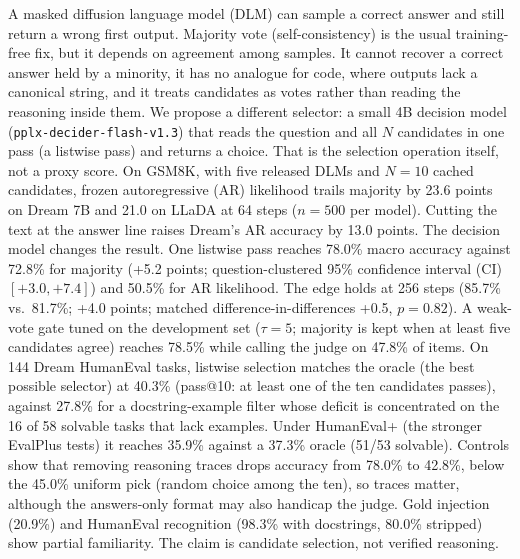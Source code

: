 A masked diffusion language model (DLM) can sample a correct answer and still return a wrong first output. Majority vote (self-consistency) is the usual training-free fix, but it depends on agreement among samples. It cannot recover a correct answer held by a minority, it has no analogue for code, where outputs lack a canonical string, and it treats candidates as votes rather than reading the reasoning inside them. We propose a different selector: a small 4B decision model (\texttt{pplx-decider-flash-v1.3}) that reads the question and all $N$ candidates in one pass (a listwise pass) and returns a choice. That is the selection operation itself, not a proxy score. On GSM8K, with five released DLMs and $N=10$ cached candidates, frozen autoregressive (AR) likelihood trails majority by 23.6 points on Dream 7B and 21.0 on LLaDA at 64 steps ($n=500$ per model). Cutting the text at the answer line raises Dream's AR accuracy by 13.0 points. The decision model changes the result. One listwise pass reaches 78.0\% macro accuracy against 72.8\% for majority (+5.2 points; question-clustered 95\% confidence interval (CI) $[+3.0,+7.4]$) and 50.5\% for AR likelihood. The edge holds at 256 steps (85.7\% vs.\ 81.7\%; +4.0 points; matched difference-in-differences +0.5, $p=0.82$). A weak-vote gate tuned on the development set ($\tau=5$; majority is kept when at least five candidates agree) reaches 78.5\% while calling the judge on 47.8\% of items. On 144 Dream HumanEval tasks, listwise selection matches the oracle (the best possible selector) at 40.3\% (pass@10: at least one of the ten candidates passes), against 27.8\% for a docstring-example filter whose deficit is concentrated on the 16 of 58 solvable tasks that lack examples. Under HumanEval+ (the stronger EvalPlus tests) it reaches 35.9\% against a 37.3\% oracle (51/53 solvable). Controls show that removing reasoning traces drops accuracy from 78.0\% to 42.8\%, below the 45.0\% uniform pick (random choice among the ten), so traces matter, although the answers-only format may also handicap the judge. Gold injection (20.9\%) and HumanEval recognition (98.3\% with docstrings, 80.0\% stripped) show partial familiarity. The claim is candidate selection, not verified reasoning.
